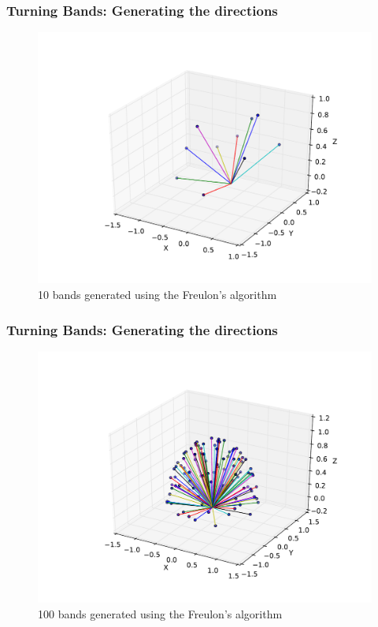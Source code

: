 \begin{frame}
\frametitle{Turning Bands: Generating the directions}
\begin{figure}
\begin{center}
\includegraphics[height=0.7\textheight]{figs/freulon_algo_10_bands.pdf}
\end{center}
\caption{10 bands generated using the Freulon's algorithm}
\label{fig:freulon_algo_10_bands}
\end{figure}
\end{frame}


\begin{frame}
\frametitle{Turning Bands: Generating the directions}
\begin{figure}
\begin{center}
\includegraphics[height=0.7\textheight]{figs/freulon_algo_100_bands.pdf}
\end{center}
\caption{100 bands generated using the Freulon's algorithm}
\label{fig:freulon_algo_100_bands}
\end{figure}
\end{frame}


